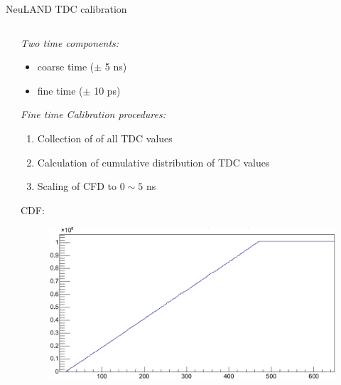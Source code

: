 \documentclass{ikpKoeln}
\begin{document}
\begin{frame}[t]{NeuLAND TDC calibration}
\begin{columns}[t]
\begin{column}{0.45\textwidth}
		\end{column}
		\begin{column}{0.45\textwidth}
			\textit{\small Two time components:}
			\begin{itemize}
				\scriptsize
				\item coarse time ($\pm$ 5 ns)
				\item fine time ($\pm$ 10 ps)
			\end{itemize}
			\textit{\small Fine time Calibration procedures:}
			\begin{enumerate}
				\scriptsize
				\item Collection of of all TDC values
				\item Calculation of cumulative distribution of TDC values
				\item Scaling of CFD to $0\sim5$ ns
			\end{enumerate}
			\vspace*{-1em}
			\flushleft \scriptsize{CDF:}
			\begin{figure}
				\vspace*{-1em}
				\includegraphics[width = \textwidth]{ neulandMeeting/mapcal_cumulative.png}
			\end{figure}
		\end{column}
	\end{columns}
\end{frame}
\end{document}
